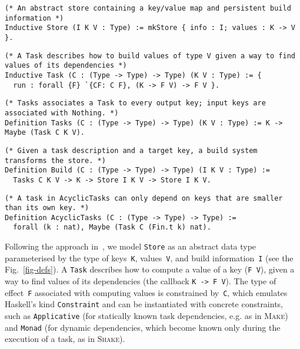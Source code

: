 \documentclass[sigplan,review]{acmart}\settopmatter{printfolios=true,printccs=false,printacmref=false}
\newcommand{\hs}{\texttt}
\newcommand{\Make}{\textsc{Make}\xspace}
\newcommand{\Shake}{\textsc{Shake}\xspace}
\begin{document}
\begin{figure*}[t]
\begin{verbatim}
(* An abstract store containing a key/value map and persistent build information *)
Inductive Store (I K V : Type) := mkStore { info : I; values : K -> V }.
\end{verbatim}
\vspace{-1mm}
\begin{verbatim}
(* A Task describes how to build values of type V given a way to find values of its dependencies *)
Inductive Task (C : (Type -> Type) -> Type) (K V : Type) := {
  run : forall {F} `{CF: C F}, (K -> F V) -> F V }.
\end{verbatim}
\vspace{-1mm}
\begin{verbatim}
(* Tasks associates a Task to every output key; input keys are associated with Nothing. *)
Definition Tasks (C : (Type -> Type) -> Type) (K V : Type) := K -> Maybe (Task C K V).
\end{verbatim}
\vspace{-1mm}
\begin{verbatim}
(* Given a task description and a target key, a build system transforms the store. *)
Definition Build (C : (Type -> Type) -> Type) (I K V : Type) :=
  Tasks C K V -> K -> Store I K V -> Store I K V.
\end{verbatim}
\vspace{-1mm}
\begin{verbatim}
(* A task in AcyclicTasks can only depend on keys that are smaller than its own key. *)
Definition AcyclicTasks (C : (Type -> Type) -> Type) :=
  forall (k : nat), Maybe (Task C (Fin.t k) nat).
\end{verbatim}
\vspace{-4mm}
\caption{Build system abstractions in Coq.}\label{fig-defs}
\vspace{-4mm}
\end{figure*}

Following the approach in~\cite{Mokhov2018icfp}, we model \hs{Store} as
an abstract data type parameterised by the type of keys~\hs{K}, values~\hs{V},
and build information~\hs{I} (see the Fig.~\ref{fig-defs}). A \hs{Task}
describes how to compute a value of a key (\hs{F V}), given a way to find values
of its dependencies (the callback \hs{K -> F V}). The type of effect~\hs{F}
associated with computing values is constrained by~\hs{C}, which emulates
Haskell's kind \hs{Constraint} and can be instantiated with concrete constraints,
such as \hs{Applicative} (for statically known task dependencies, e.g. as in \Make)
and \hs{Monad} (for dynamic dependencies, which become known only during the
execution of a task, as in \Shake).
\end{document}
